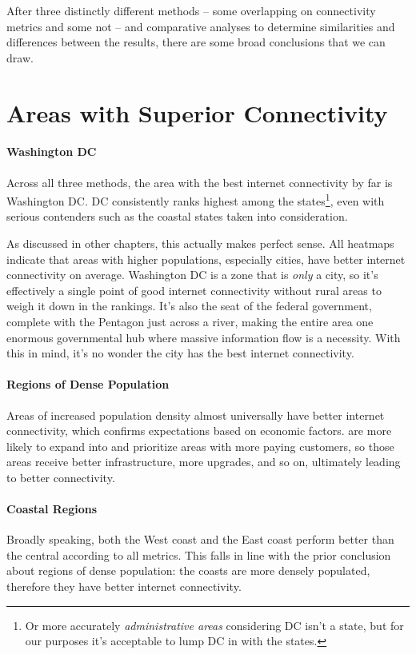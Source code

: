 After three distinctly different methods -- some overlapping on connectivity metrics and some not -- and comparative analyses to determine similarities and differences between the results, there are some broad conclusions that we can draw.

\section{Areas with Superior Connectivity}

\paragraph{Washington DC} Across all three methods, the area with the best internet connectivity by far is Washington DC. DC consistently ranks highest among the states\footnote{Or more accurately \textit{administrative areas} considering DC isn't a state, but for our purposes it's acceptable to lump DC in with the states.}, even with serious contenders such as the coastal states taken into consideration.

As discussed in other chapters, this actually makes perfect sense. All heatmaps indicate that areas with higher populations, especially cities, have better internet connectivity on average. Washington DC is a zone that is \textit{only} a city, so it's effectively a single point of good internet connectivity without rural areas to weigh it down in the rankings. It's also the seat of the \us federal government, complete with the Pentagon just across a river, making the entire area one enormous governmental hub where massive information flow is a necessity. With this in mind, it's no wonder the city has the best internet connectivity.

\paragraph{Regions of Dense Population} Areas of increased population density almost universally have better internet connectivity, which confirms expectations based on economic factors. \ISPs are more likely to expand into and prioritize areas with more paying customers, so those areas receive better infrastructure, more upgrades, and so on, ultimately leading to better connectivity.

\paragraph{Coastal Regions} Broadly speaking, both the West coast and the East coast perform better than the central \us according to all metrics. This falls in line with the prior conclusion about regions of dense population: the coasts are more densely populated, therefore they have better internet connectivity.

